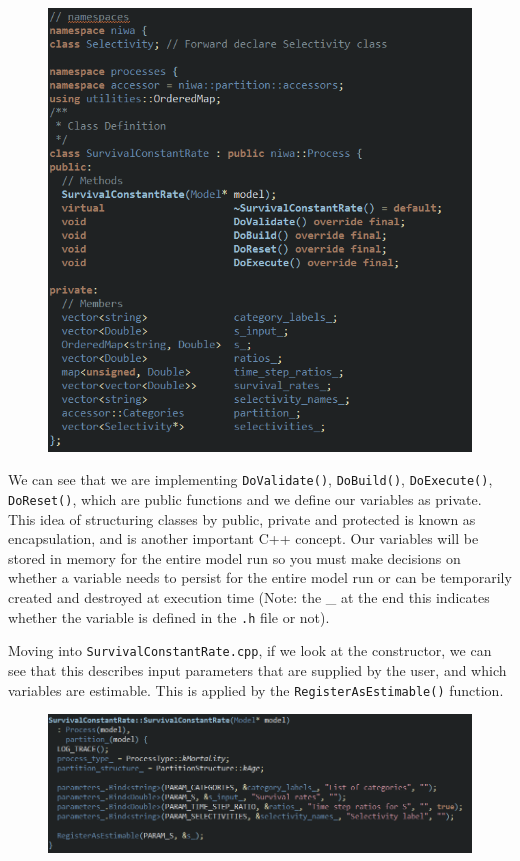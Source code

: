 \begin{figure}[!ht]
	\centering
	\includegraphics[scale=0.6]{Figures/process_h.png}
	\caption{}\label{fig:process_h}
\end{figure}

We can see that we are implementing \texttt{DoValidate()}, \texttt{DoBuild()}, \texttt{DoExecute()}, \texttt{DoReset()}, which are public functions and we define our variables as private. This idea of structuring classes by public, private and protected is known as encapsulation, and is another important C++ concept. Our variables will be stored in memory for the entire model run so you must make decisions on whether a variable needs to persist for the entire model run or can be temporarily created and destroyed at execution time (Note: the \_ at the end this indicates whether the variable is defined in the \texttt{.h} file or not). 

Moving into \texttt{SurvivalConstantRate.cpp}, if we look at the constructor, we can see that this describes input parameters that are supplied by the user, and which variables are estimable. This is applied by the \texttt{RegisterAsEstimable()} function.

\begin{figure}[!ht]
	\centering
	\includegraphics[scale=0.8]{Figures/constructor.png}
	\caption{}\label{fig:constructor}
\end{figure}


